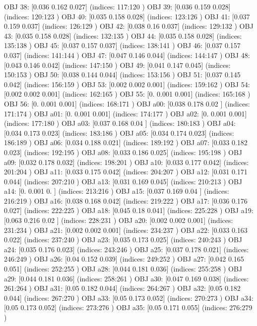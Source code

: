 OBJ 38: [0.036 0.162 0.027] (indices: 117:120 )
OBJ 39: [0.036 0.159 0.028] (indices: 120:123 )
OBJ 40: [0.035 0.158 0.028] (indices: 123:126 )
OBJ 41: [0.037 0.159 0.037] (indices: 126:129 )
OBJ 42: [0.038 0.16  0.037] (indices: 129:132 )
OBJ 43: [0.035 0.158 0.028] (indices: 132:135 )
OBJ 44: [0.035 0.158 0.028] (indices: 135:138 )
OBJ 45: [0.037 0.157 0.037] (indices: 138:141 )
OBJ 46: [0.037 0.157 0.037] (indices: 141:144 )
OBJ 47: [0.047 0.146 0.044] (indices: 144:147 )
OBJ 48: [0.043 0.146 0.042] (indices: 147:150 )
OBJ 49: [0.041 0.147 0.045] (indices: 150:153 )
OBJ 50: [0.038 0.144 0.044] (indices: 153:156 )
OBJ 51: [0.037 0.145 0.042] (indices: 156:159 )
OBJ 53: [0.002 0.002 0.001] (indices: 159:162 )
OBJ 54: [0.002 0.002 0.001] (indices: 162:165 )
OBJ 55: [0.    0.001 0.001] (indices: 165:168 )
OBJ 56: [0.    0.001 0.001] (indices: 168:171 )
OBJ a00: [0.038 0.178 0.02 ] (indices: 171:174 )
OBJ a01: [0.    0.001 0.001] (indices: 174:177 )
OBJ a02: [0.    0.001 0.001] (indices: 177:180 )
OBJ a03: [0.037 0.168 0.04 ] (indices: 180:183 )
OBJ a04: [0.034 0.173 0.023] (indices: 183:186 )
OBJ a05: [0.034 0.174 0.023] (indices: 186:189 )
OBJ a06: [0.034 0.188 0.021] (indices: 189:192 )
OBJ a07: [0.033 0.182 0.023] (indices: 192:195 )
OBJ a08: [0.033 0.186 0.025] (indices: 195:198 )
OBJ a09: [0.032 0.178 0.032] (indices: 198:201 )
OBJ a10: [0.033 0.177 0.042] (indices: 201:204 )
OBJ a11: [0.033 0.175 0.042] (indices: 204:207 )
OBJ a12: [0.031 0.171 0.044] (indices: 207:210 )
OBJ a13: [0.031 0.169 0.045] (indices: 210:213 )
OBJ a14: [0.    0.001 0.   ] (indices: 213:216 )
OBJ a15: [0.037 0.169 0.04 ] (indices: 216:219 )
OBJ a16: [0.038 0.168 0.042] (indices: 219:222 )
OBJ a17: [0.036 0.176 0.027] (indices: 222:225 )
OBJ a18: [0.045 0.18  0.041] (indices: 225:228 )
OBJ a19: [0.063 0.216 0.02 ] (indices: 228:231 )
OBJ a20: [0.002 0.002 0.001] (indices: 231:234 )
OBJ a21: [0.002 0.002 0.001] (indices: 234:237 )
OBJ a22: [0.033 0.163 0.022] (indices: 237:240 )
OBJ a23: [0.035 0.173 0.025] (indices: 240:243 )
OBJ a24: [0.035 0.176 0.023] (indices: 243:246 )
OBJ a25: [0.037 0.178 0.021] (indices: 246:249 )
OBJ a26: [0.04  0.152 0.039] (indices: 249:252 )
OBJ a27: [0.042 0.165 0.051] (indices: 252:255 )
OBJ a28: [0.044 0.181 0.036] (indices: 255:258 )
OBJ a29: [0.044 0.181 0.036] (indices: 258:261 )
OBJ a30: [0.047 0.169 0.038] (indices: 261:264 )
OBJ a31: [0.05  0.182 0.044] (indices: 264:267 )
OBJ a32: [0.05  0.182 0.044] (indices: 267:270 )
OBJ a33: [0.05  0.173 0.052] (indices: 270:273 )
OBJ a34: [0.05  0.173 0.052] (indices: 273:276 )
OBJ a35: [0.05  0.171 0.055] (indices: 276:279 )
